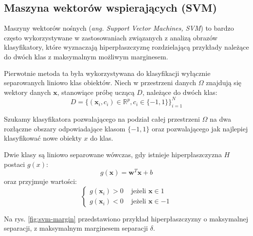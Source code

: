 \subsection{Maszyna wektorów wspierających (SVM)}
Maszyny wektorów nośnych (\emph{ang. Support Vector Machines, SVM}) to bardzo często wykorzystywane w zastosowaniach związanych z analizą obrazów klasyfikatory, które wyznaczają hiperpłaszczyznę rozdzielającą przykłady należące do dwóch klas z maksymalnym możliwym marginesem.

Pierwotnie metoda ta była wykorzystywana do klasyfikacji wyłącznie separowanych liniowo klas obiektów. Niech w przestrzeni danych $\Omega$ znajdują się wektory danych $\boldsymbol{x}$, stanowiące próbę uczącą $D$, należące do dwóch klas:
\begin{equation} 
\label{svm-D-of-two-classes} 
D = {\{ (\boldsymbol{x}_i, c_i) \in \mathbb{R}^p, c_i \in \{-1, 1\}  \}}_{i=1}^N
\end{equation}

Szukamy klasyfikatora pozwalającego na podział całej przestrzeni $\Omega$ na dwa rozłączne obszary odpowiadające klasom $\{-1, 1\}$ oraz pozwalającego jak najlepiej klasyfikować nowe obiekty $x$ do klas. 

Dwie klasy są liniowo separowane wówczas, gdy istnieje hiperpłaszczyzna $H$ postaci $g(x)$:
\begin{equation} 
\label{svm-linear-separate} 
g(\boldsymbol{x}) = \boldsymbol{w}^T \boldsymbol{x} + b
\end{equation} oraz przyjmuje wartości:
\begin{equation} 
\label{svm-gx} 
\begin{cases}
	g(\boldsymbol{x}_i) > 0 & \text{ jeżeli } \boldsymbol{x} \in 1 \\
	g(\boldsymbol{x}_i) < 0 & \text{ jeżeli } \boldsymbol{x} \in -1
\end{cases}
\end{equation}

Na rys. \ref{fig:svm-margin} przedstawiono przykład hiperpłaszczyzny o maksymalnej separacji, z maksymalnym marginesem separacji $\delta$. 

